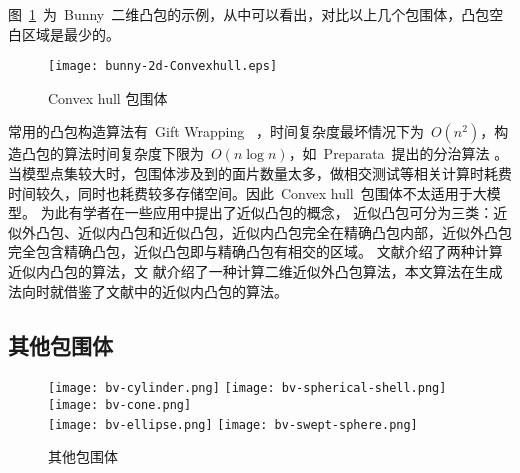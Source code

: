 图~\ref{fig:convexhull-bunny}~为~Bunny~二维凸包的示例，从中可以看出，对比以上几个包围体，凸包空白区域是最少的。
\begin{figure}[htbp] %
  \centering
  \texttt{[image: bunny-2d-Convexhull.eps]}
  \caption{Convex hull 包围体}
  \label{fig:convexhull-bunny}
\end{figure}
常用的凸包构造算法\cite{dengcg}有~Gift Wrapping~%
，时间复杂度最坏情况下为~$O(n^2)$，构造凸包的算法时间复杂度下限为~$O(n\log n)$，如~Preparata~提出的分治算法%
。
当模型点集较大时，包围体涉及到的面片数量太多，做相交测试等相关计算时耗费时间较久，同时也耗费较多存储空间。因此~Convex hull~包围体不太适用于大模型。
为此有学者在一些应用中提出了近似凸包的概念，
近似凸包可分为三类：近似外凸包、近似内凸包和近似凸包\cite{hossain2013constructing}，近似内凸包完全在精确凸包内部，近似外凸包完全包含精确凸包，近似凸包即与精确凸包有相交的区域。
文献介绍了两种计算近似内凸包的算法，文
献介绍了一种计算二维近似外凸包算法，本文算法在生成法向时就借鉴了文献中的近似内凸包的算法。

\subsection{其他包围体}

\begin{figure}[htbp]
  \centering%
    {\texttt{[image: bv-cylinder.png]}}
    {\texttt{[image: bv-spherical-shell.png]}}
    {\texttt{[image: bv-cone.png]}}
  \\
    {\texttt{[image: bv-ellipse.png]}}
    {\texttt{[image: bv-swept-sphere.png]}}
  \caption{其他包围体}
  \label{fig:bv-others}
\end{figure}

